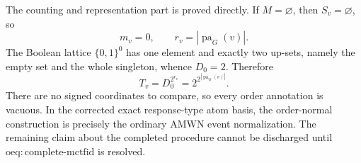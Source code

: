 The counting and representation part is proved directly.  If \(M=\varnothing\), then \(S_v=\varnothing\), so
\[
 m_v=0,
 \qquad
 r_v=|\operatorname{pa}_G(v)|.
\]
The Boolean lattice \(\{0,1\}^0\) has one element and exactly two up-sets, namely the empty set and the whole singleton, whence \(D_0=2\).  Therefore
\[
 T_v=D_0^{2^{r_v}}
 =2^{2^{|\operatorname{pa}_G(v)|}}.
\]
There are no signed coordinates to compare, so every order annotation is vacuous.  In the corrected exact response-type atom basis, the order-normal construction is precisely the ordinary AMWN event normalization.  The remaining claim about the completed procedure cannot be discharged until \(\mathrm{oeq:complete\text{-}mctfid}\) is resolved.